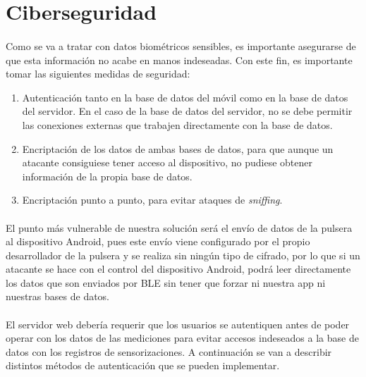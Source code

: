 \section{Ciberseguridad}
\label{sec:ciber}
\paragraph{}
Como se va a tratar con datos biométricos sensibles, es importante asegurarse de que esta información no acabe en manos indeseadas. Con este fin, es importante tomar las siguientes medidas de seguridad:
\begin{enumerate}
\item Autenticación tanto en la base de datos del móvil como en la base de datos del servidor. En el caso de la base de datos del servidor, no se debe permitir las conexiones externas que trabajen directamente con la base de datos.
\item Encriptación de los datos de ambas bases de datos, para que aunque un atacante consiguiese tener acceso al dispositivo, no pudiese obtener información de la propia base de datos.
\item Encriptación punto a punto, para evitar ataques de \textit{sniffing}.
\end{enumerate}

\paragraph{}
El punto más vulnerable de nuestra solución será el envío de datos de la pulsera al dispositivo Android, pues este envío viene configurado por el propio desarrollador de la pulsera y se realiza sin ningún tipo de cifrado, por lo que si un atacante se hace con el control del dispositivo Android, podrá leer directamente los datos que son enviados por BLE sin tener que forzar ni nuestra app ni nuestras bases de datos.

\paragraph{}
El servidor web debería requerir que los usuarios se autentiquen antes de poder operar con los datos de las mediciones para evitar accesos indeseados a la base de datos con los registros de sensorizaciones. A continuación se van a describir distintos métodos de autenticación que se pueden implementar.

